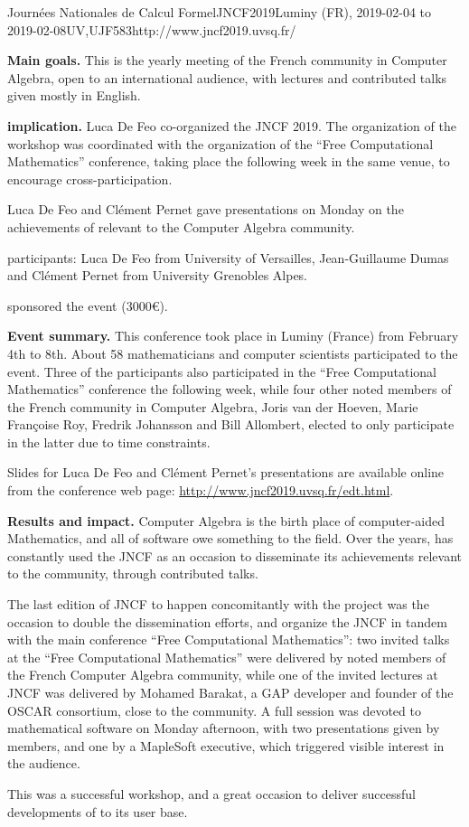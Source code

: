 \begin{event}{Journées Nationales de Calcul Formel}{JNCF2019}{Luminy (FR),
  2019-02-04 to
  2019-02-08}{UV,UJF}{58}{3}{http://www.jncf2019.uvsq.fr/}
  
\textbf{Main goals.} This is the yearly meeting of the French community in
Computer Algebra, open to an international audience, with lectures and
contributed talks given mostly in English.

\textbf{\ODK implication.} Luca De Feo co-organized the JNCF 2019. The
organization of the workshop was coordinated with the organization of
the ``Free Computational Mathematics'' conference, taking place the
following week in the same venue, to encourage cross-participation.

Luca De Feo and Clément Pernet gave presentations on Monday on the
achievements of \ODK relevant to the Computer Algebra
community.

\ODK participants: Luca De Feo from University of Versailles,
Jean-Guillaume Dumas and Clément Pernet from University Grenobles
Alpes.

\ODK sponsored the event (3000\euro {}).

\textbf{Event summary.} This conference took place in Luminy (France) from
February 4th to 8th. About 58 mathematicians and computer scientists
participated to the event. Three of the participants also participated
in the ``Free Computational Mathematics'' conference the following
week, while four other noted members of the French community in
Computer Algebra, Joris van der Hoeven, Marie Françoise Roy, Fredrik
Johansson and Bill Allombert, elected to only participate in the latter
due to time constraints.

Slides for Luca De Feo and Clément Pernet's presentations are
available online from the conference web page:
\url{http://www.jncf2019.uvsq.fr/edt.html}.

\textbf{Results and impact.} Computer Algebra is the birth place of
computer-aided Mathematics, and all of \ODK software owe something to
the field. Over the years, \ODK has constantly used the JNCF as an
occasion to disseminate its achievements relevant to the community,
through contributed talks.

The last edition of JNCF to happen concomitantly with the project was
the occasion to double the dissemination efforts, and organize the
JNCF in tandem with the main \ODK conference ``Free Computational
Mathematics'': two invited talks at the ``Free Computational
Mathematics'' were delivered by noted members of the French Computer
Algebra community, while one of the invited lectures at JNCF was
delivered by Mohamed Barakat, a GAP developer and founder of the OSCAR
consortium, close to the \ODK community. A full session was devoted to
mathematical software on Monday afternoon, with two presentations
given by \ODK members, and one by a MapleSoft executive, which
triggered visible interest in the audience.

This was a successful workshop, and a great occasion to deliver 
successful developments of \ODK to its user base.
\end{event}
